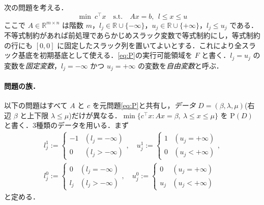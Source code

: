 \documentclass[11pt,a4paper]{ltjsarticle}
\theoremstyle{plain}
\theoremstyle{definition}
\theoremstyle{remark}
\newcommand{\R}{\mathbb{R}}
\newcommand{\Pb}{\mathrm{P}}
\begin{document}
次の問題を考える．
\begin{equation}
  \min\ c^\top x \quad\text{s.t.}\quad Ax=b,\ \ l\le x\le u
  \label{eq:P}
\end{equation}
ここで $A\in\R^{m\times n}$ は階数 $m$，$l_j\in\R\cup\{-\infty\}$，$u_j\in\R\cup\{+\infty\}$，$l_j\le u_j$ である．不等式制約があれば前処理であらかじめスラック変数で等式制約にし，等式制約の行にも $[0,0]$ に固定したスラック列を置いてよいとする．これにより全スラック基底を初期基底として使える．\eqref{eq:P}の実行可能領域を $F$ と書く．$l_j=u_j$ の変数を\emph{固定変数}，$l_j=-\infty$ かつ $u_j=+\infty$ の変数を\emph{自由変数}と呼ぶ．

\paragraph{問題の族．}
以下の問題はすべて $A$ と $c$ を元問題\eqref{eq:P}と共有し，\emph{データ} $D=(\beta,\lambda,\mu)$(右辺 $\beta$ と上下限 $\lambda\le\mu$)だけが異なる．$\min\{c^\top x: Ax=\beta,\ \lambda\le x\le\mu\}$ を $\Pb(D)$ と書く．3種類のデータを用いる．まず
\begin{gather*}
  l_j^1:=\begin{cases}-1&(l_j=-\infty)\\0&(l_j>-\infty)\end{cases},\quad
  u_j^1:=\begin{cases}1&(u_j=+\infty)\\0&(u_j<+\infty)\end{cases},\\
  l_j^0:=\begin{cases}0&(l_j=-\infty)\\l_j&(l_j>-\infty)\end{cases},\quad
  u_j^0:=\begin{cases}0&(u_j=+\infty)\\u_j&(u_j<+\infty)\end{cases}
\end{gather*}
と定める．
\end{document}
